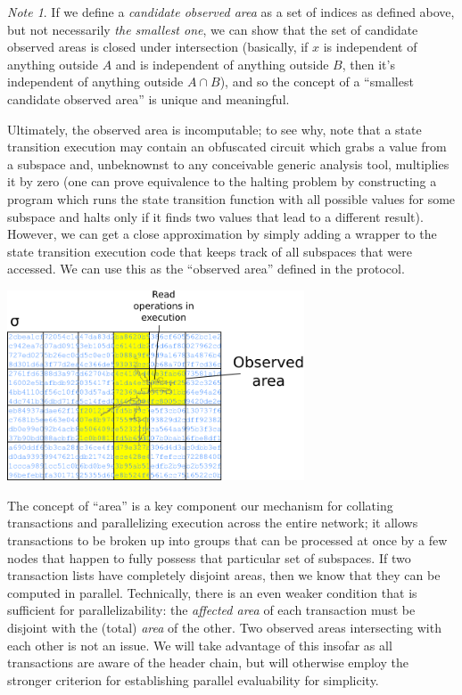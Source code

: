 \documentclass[11pt,a4paper]{article}
\theoremstyle{plain}
\theoremstyle{definition}
\theoremstyle{remark}
\newtheorem*{note}{Note}
\begin{document}
\begin{note}
If we define a \emph{candidate observed area} as a set of indices as defined above, but not necessarily \emph{the smallest one}, we can show that the set of candidate observed areas is closed under intersection (basically, if $x$ is independent of anything outside $A$ and is independent of anything outside $B$, then it's independent of anything outside $A \cap B$), and so the concept of a ``smallest candidate observed area'' is unique and meaningful.

Ultimately, the observed area is incomputable; to see why, note that a state transition execution may contain an obfuscated circuit which grabs a value from a subspace and, unbeknownst to any conceivable generic analysis tool, multiplies it by zero (one can prove equivalence to the halting problem by constructing a program which runs the state transition function with all possible values for some subspace and halts only if it finds two values that lead to a different result). However, we can get a close approximation by simply adding a wrapper to the state transition execution code that keeps track of all subspaces that were accessed. We can use this as the ``observed area'' defined in the protocol.
\end{note}

\begin{center}
\includegraphics[width=250pt]{subspace3.png}
\end{center}

The concept of ``area'' is a key component our mechanism for collating transactions and parallelizing execution across the entire network; it allows transactions to be broken up into groups that can be processed at once by a few nodes that happen to fully possess that particular set of subspaces. If two transaction lists have completely disjoint areas, then we know that they can be computed in parallel. Technically, there is an even weaker condition that is sufficient for parallelizability: the \emph{affected area} of each transaction must be disjoint with the (total) \emph{area} of the other. Two observed areas intersecting with each other is not an issue. We will take advantage of this insofar as all transactions are aware of the header chain, but will otherwise employ the stronger criterion for establishing parallel evaluability for simplicity.
\end{document}
